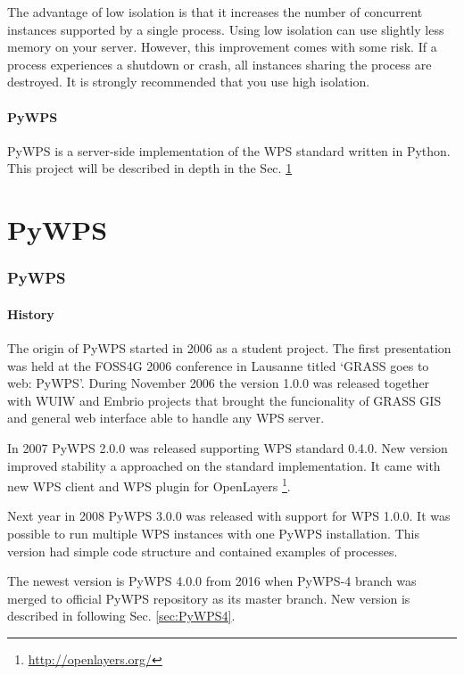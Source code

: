 \documentclass[12pt,a4paper]{article}
\begin{document}
The advantage of low isolation is that it increases the number of concurrent instances supported by a single process. Using low isolation can use slightly less memory on your server. However, this improvement comes with some risk. If a process experiences a shutdown or crash, all instances sharing the process are destroyed. It is strongly recommended that you use high isolation.\cite{AG_docs}

\subsection{PyWPS}
PyWPS is a server-side implementation of the WPS standard written in Python. This project will be described in depth in the Sec. \ref{sec:PyWPS}

\newpage
\part{PyWPS}

\newpage
\section{PyWPS}
\label{sec:PyWPS}
\subsection{History}
The origin of PyWPS started in 2006 as a student project. The first presentation was held at the FOSS4G 2006 conference in Lausanne titled 
‘GRASS goes to web: PyWPS’. During November 2006 the version 1.0.0 was released together with WUIW and Embrio projects that brought the
funcionality of GRASS GIS and general web interface able to handle any WPS server.\cite{PyWPS_presentation}\cite{PyWPS_web}

In 2007 PyWPS 2.0.0 was released supporting WPS standard 0.4.0. New version improved stability a approached on the standard implementation. It came with new WPS client and WPS plugin for OpenLayers \footnote{\url{http://openlayers.org/}}.

Next year in 2008 PyWPS 3.0.0 was released with support for WPS 1.0.0. It was possible to run multiple WPS instances
with one PyWPS installation. This version had simple code structure and contained examples of processes. 

The newest version is PyWPS 4.0.0 from 2016 when PyWPS-4 branch was merged to official PyWPS repository as its master branch.
 New version is described in following Sec. \ref{sec:PyWPS4}.
\end{document}
